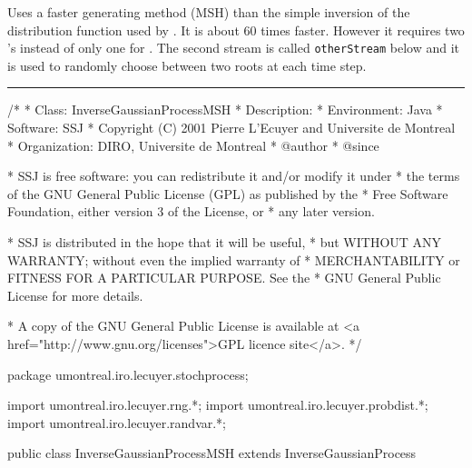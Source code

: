 
Uses a faster generating method (MSH) \cite{rMIC76a} 
than the simple inversion of the distribution function
used by  .  
It is about 60 times faster.
However it requires two 
's instead
of only one for .
The second stream is called \texttt{otherStream} below and
it is used to randomly choose between two roots at each time step.


\bigskip\hrule\bigskip

\begin{code}
\begin{hide}
/*
 * Class:        InverseGaussianProcessMSH
 * Description:  
 * Environment:  Java
 * Software:     SSJ 
 * Copyright (C) 2001  Pierre L'Ecuyer and Universite de Montreal
 * Organization: DIRO, Universite de Montreal
 * @author       
 * @since

 * SSJ is free software: you can redistribute it and/or modify it under
 * the terms of the GNU General Public License (GPL) as published by the
 * Free Software Foundation, either version 3 of the License, or
 * any later version.

 * SSJ is distributed in the hope that it will be useful,
 * but WITHOUT ANY WARRANTY; without even the implied warranty of
 * MERCHANTABILITY or FITNESS FOR A PARTICULAR PURPOSE.  See the
 * GNU General Public License for more details.

 * A copy of the GNU General Public License is available at
   <a href="http://www.gnu.org/licenses">GPL licence site</a>.
 */
\end{hide}
package umontreal.iro.lecuyer.stochprocess;\begin{hide}
import umontreal.iro.lecuyer.rng.*;
import umontreal.iro.lecuyer.probdist.*;
import umontreal.iro.lecuyer.randvar.*;

\end{hide}

public class InverseGaussianProcessMSH extends InverseGaussianProcess \begin{hide} {

    // otherStream is used to decide between the two roots in method MSH.
    protected RandomStream otherStream;
    // Needed for the MSH method of generating inverse gaussian.
    protected NormalGen normalGen;
\end{hide}
\end{code}

